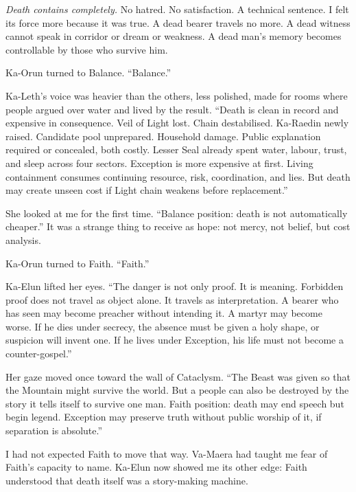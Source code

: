 \emph{Death contains completely.} No hatred. No satisfaction. A technical sentence. I felt its force more because it was true. A dead bearer travels no more. A dead witness cannot speak in corridor or dream or weakness. A dead man's memory becomes controllable by those who survive him.\par

Ka-Orun turned to Balance. ``Balance.''\par

Ka-Leth's voice was heavier than the others, less polished, made for rooms where people argued over water and lived by the result. ``Death is clean in record and expensive in consequence. Veil of Light lost. Chain destabilised. Ka-Raedin newly raised. Candidate pool unprepared. Household damage. Public explanation required or concealed, both costly. Lesser Seal already spent water, labour, trust, and sleep across four sectors. Exception is more expensive at first. Living containment consumes continuing resource, risk, coordination, and lies. But death may create unseen cost if Light chain weakens before replacement.''\par

She looked at me for the first time. ``Balance position: death is not automatically cheaper.'' It was a strange thing to receive as hope: not mercy, not belief, but cost analysis.\par

Ka-Orun turned to Faith. ``Faith.''\par

Ka-Elun lifted her eyes. ``The danger is not only proof. It is meaning. Forbidden proof does not travel as object alone. It travels as interpretation. A bearer who has seen may become preacher without intending it. A martyr may become worse. If he dies under secrecy, the absence must be given a holy shape, or suspicion will invent one. If he lives under Exception, his life must not become a counter-gospel.''\par

Her gaze moved once toward the wall of Cataclysm. ``The Beast was given so that the Mountain might survive the world. But a people can also be destroyed by the story it tells itself to survive one man. Faith position: death may end speech but begin legend. Exception may preserve truth without public worship of it, if separation is absolute.''\par

I had not expected Faith to move that way. Va-Maera had taught me fear of Faith's capacity to name. Ka-Elun now showed me its other edge: Faith understood that death itself was a story-making machine.\par


